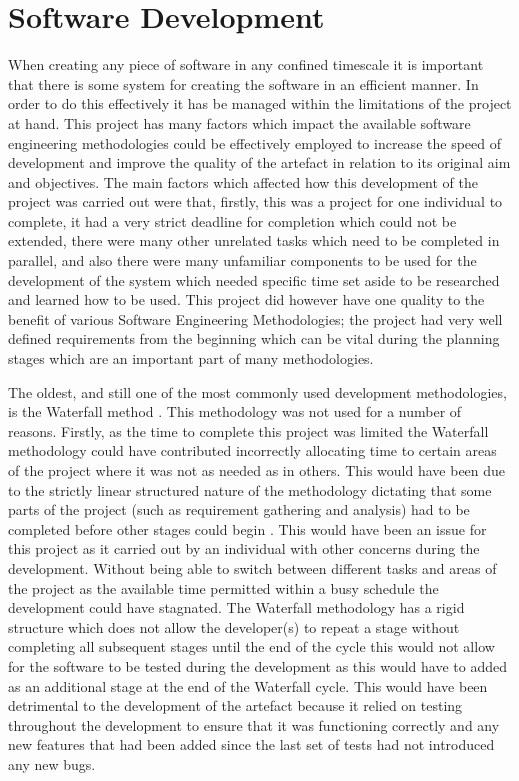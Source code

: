\documentclass[11pt,a4paper]{report}
\begin{document}
\pagebreak

\section{Software Development}
When creating any piece of software in any confined timescale it is important that there is some system for creating the software in an efficient manner. In order to do this effectively it has be managed within the limitations of the project at hand. This project has many factors which impact the available software engineering methodologies could be effectively employed to increase the speed of development and improve the quality of the artefact in relation to its original aim and objectives. The main factors which affected how this development of the project was carried out were that, firstly, this was a project for one individual to complete, it had a very strict deadline for completion which could not be extended, there were many other unrelated tasks which need to be completed in parallel, and also there were many unfamiliar components to be used for the development of the system which needed specific time set aside to be researched and learned how to be used. This project did however have one quality to the benefit of various Software Engineering Methodologies; the project had very well defined requirements from the beginning which can be vital during the planning stages which are an important part of many methodologies.

The oldest, and still one of the most commonly used development methodologies, is the Waterfall method \citep{shaydulin2017agile}. This methodology was not used for a number of reasons. Firstly, as the time to complete this project was limited the Waterfall methodology could have contributed incorrectly allocating time to certain areas of the project where it was not as needed as in others. This would have been due to the strictly linear structured nature of the methodology dictating that some parts of the project (such as requirement gathering and analysis) had to be completed before other stages could begin \citep{shaydulin2017agile}. This would have been an issue for this project as it carried out by an individual with other concerns during the development. Without being able to switch between different tasks and areas of the project as the available time permitted within a busy schedule the development could have stagnated. The Waterfall methodology has a rigid structure which does not allow the developer(s) to repeat a stage without completing all subsequent stages until the end of the cycle \citep{WaterfallPresentation} this would not allow for the software to be tested during the development as this would have to added as an additional stage at the end of the Waterfall cycle. This would have been detrimental to the development of the artefact because it relied on testing throughout the development to ensure that it was functioning correctly and any new features that had been added since the last set of tests had not introduced any new bugs.
\end{document}
